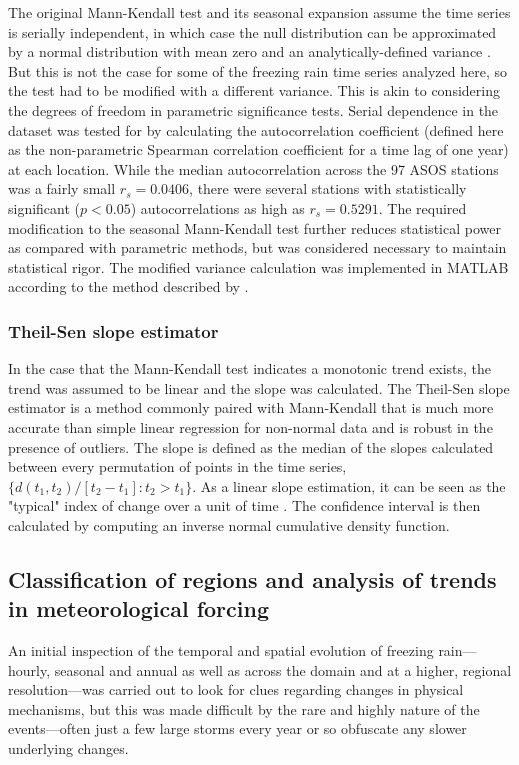 \documentclass[twocol]{ametsoc}
\begin{document}
The original Mann-Kendall test and its seasonal expansion assume the time series is serially independent, in which case the null distribution can be approximated by a normal distribution with mean zero and an analytically-defined variance \citep{kendall1955rank}. But this is not the case for some of the freezing rain time series analyzed here, so the test had to be modified with a different variance. This is akin to considering the degrees of freedom in parametric significance tests. Serial dependence in the dataset was tested for by calculating the autocorrelation coefficient (defined here as the non-parametric Spearman correlation coefficient for a time lag of one year) at each location. While the median autocorrelation across the 97 ASOS stations was a fairly small $r_s = 0.0406$, there were several stations with statistically significant ($p<0.05$) autocorrelations as high as $r_s = 0.5291$. The required modification to the seasonal Mann-Kendall test further reduces statistical power as compared with parametric methods, but was considered necessary to maintain statistical rigor. The modified variance calculation was implemented in MATLAB according to the method described by \citet{hirsch1984nonparametric}.

\subsubsection{Theil-Sen slope estimator}
In the case that the Mann-Kendall test indicates a monotonic trend exists, the trend was assumed to be linear and the slope was calculated. The Theil-Sen slope estimator is a method commonly paired with Mann-Kendall that is much more accurate than simple linear regression for non-normal data and is robust in the presence of outliers. The slope is defined as the median of the slopes calculated between every permutation of points in the time series, $\{d(t_1,t_2)/[t_2-t_1]:t_2>t_1\}$. As a linear slope estimation, it can be seen as the "typical" index of change over a unit of time \citep{chandler2011statistical}. The confidence interval is then calculated by computing an inverse normal cumulative density function.

\subsection{Classification of regions and analysis of trends in meteorological forcing}
An initial inspection of the temporal and spatial evolution of freezing rain---hourly, seasonal and annual as well as across the domain and at a higher, regional resolution---was carried out to look for clues regarding changes in physical mechanisms, but this was made difficult by the rare and highly nature of the events---often just a few large storms every year or so obfuscate any slower underlying changes.
\end{document}
